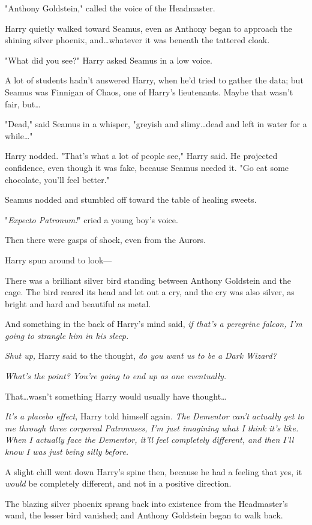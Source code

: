 "Anthony Goldstein," called the voice of the Headmaster.

Harry quietly walked toward Seamus, even as Anthony began to approach the
shining silver phoenix, and…whatever it was beneath the tattered cloak.

"What did you see?" Harry asked Seamus in a low voice.

A lot of students hadn't answered Harry, when he'd tried to gather the data;
but Seamus was Finnigan of Chaos, one of Harry's lieutenants. Maybe that wasn't
fair, but…

"Dead," said Seamus in a whisper, "greyish and slimy…dead and left in
water for a while…"

Harry nodded. "That's what a lot of people see," Harry said. He projected
confidence, even though it was fake, because Seamus needed it. "Go eat some
chocolate, you'll feel better."

Seamus nodded and stumbled off toward the table of healing sweets.

"\emph{Expecto Patronum!}" cried a young boy's voice.

Then there were gasps of shock, even from the Aurors.

Harry spun around to look—

There was a brilliant silver bird standing between Anthony Goldstein and the
cage. The bird reared its head and let out a cry, and the cry was also silver,
as bright and hard and beautiful as metal.

And something in the back of Harry's mind said, \emph{if that's a peregrine
falcon, I'm going to strangle him in his sleep.}

\emph{Shut up,} Harry said to the thought, \emph{do you want us to be a Dark
Wizard?}

\emph{What's the point? You're going to end up as one eventually.}

That…wasn't something Harry would usually have thought…

\emph{It's a placebo effect,} Harry told himself again. \emph{The Dementor
can't actually get to me through three corporeal Patronuses, I'm just imagining
what I think it's like. When I actually face the Dementor, it'll feel
completely different, and then I'll know I was just being silly before.}

A slight chill went down Harry's spine then, because he had a feeling that yes,
it \emph{would} be completely different, and not in a positive direction.

The blazing silver phoenix sprang back into existence from the Headmaster's
wand, the lesser bird vanished; and Anthony Goldstein began to walk back.

